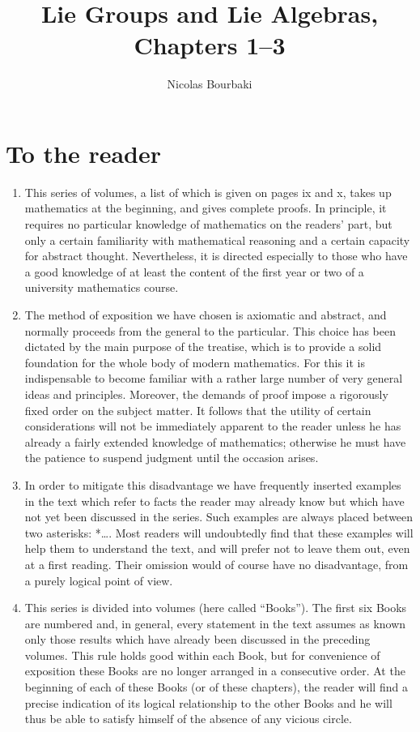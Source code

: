 \documentclass[12pt,a4paper,oneside]{book}
\title{Lie Groups and Lie Algebras, Chapters 1–3}
\author{Nicolas Bourbaki}
\date{}
\newcommand{\specialchapter}[1]{%
  \chapter*{#1}%
  \phantomsection
  \addcontentsline{toc}{chapter}{#1}%
}
\begin{document}
\maketitle
\clearpage
\frontmatter
\tableofcontents

\specialchapter{To the reader}

\begin{enumerate}
\def\labelenumi{\arabic{enumi}.}
\item
  This series of volumes, a list of which is given on pages ix and x, takes up mathematics at the beginning, and gives complete proofs. In principle, it requires no particular knowledge of mathematics on the readers' part, but only a certain familiarity with mathematical reasoning and a certain capacity for abstract thought. Nevertheless, it is directed especially to those who have a good knowledge of at least the content of the first year or two of a university mathematics course.
\item
  The method of exposition we have chosen is axiomatic and abstract, and normally proceeds from the general to the particular. This choice has been dictated by the main purpose of the treatise, which is to provide a solid foundation for the whole body of modern mathematics. For this it is indispensable to become familiar with a rather large number of very general ideas and principles. Moreover, the demands of proof impose a rigorously fixed order on the subject matter. It follows that the utility of certain considerations will not be immediately apparent to the reader unless he has already a fairly extended knowledge of mathematics; otherwise he must have the patience to suspend judgment until the occasion arises.
\item
  In order to mitigate this disadvantage we have frequently inserted examples in the text which refer to facts the reader may already know but which have not yet been discussed in the series. Such examples are always placed between two asterisks: *\ldots*. Most readers will undoubtedly find that these examples will help them to understand the text, and will prefer not to leave them out, even at a first reading. Their omission would of course have no disadvantage, from a purely logical point of view.
\item
  This series is divided into volumes (here called ``Books''). The first six Books are numbered and, in general, every statement in the text assumes as known only those results which have already been discussed in the preceding volumes. This rule holds good within each Book, but for convenience of exposition these Books are no longer arranged in a consecutive order. At the beginning of each of these Books (or of these chapters), the reader will find a precise indication of its logical relationship to the other Books and he will thus be able to satisfy himself of the absence of any vicious circle.

\end{enumerate}
\end{document}
